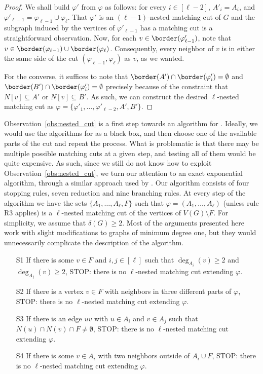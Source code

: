 \begin{proof}
	We shall build $\varphi'$ from $\varphi$ as follows: for every $i \in [\ell - 2]$, $A'_i = A_i$, and $\varphi'_{\ell - 1} = \varphi_{\ell - 1} \cup \varphi_\ell$.
	That $\varphi'$ is an $(\ell - 1)$-nested matching cut of $G$ and the subgraph induced by the vertices of $\varphi'_{\ell - 1}$ has a matching cut is a straightforward observation.
	Now, for each $v \in \border(\varphi'_{\ell - 1})$, note that $v \in \border(\varphi_{\ell - 1}) \cup \border(\varphi_\ell)$.
	Consequently, every neighbor of $v$ is in either the same side of the cut $(\varphi_{\ell - 1}, \varphi_\ell)$ as $v$, as we wanted.
	
	For the converse, it suffices to note that $\border(A') \cap \border(\varphi'_i) = \emptyset$ and $\border(B') \cap \border(\varphi'_i) = \emptyset$ precisely because of the constraint that $N[v] \subseteq A'$ or $N[v] \subseteq B'$.
	As such, we can construct the desired $\ell$-nested matching cut as $\varphi = \{\varphi'_1, \dots, \varphi'_{\ell - 2}, A', B'\}$.
\end{proof}

Observation~\ref{obs:nested_cut} is a first step towards an algorithm for .
Ideally,  we would use the algorithms for  as a black box, and then choose one of the available parts of the cut and repeat the process.
What is problematic is that there may be multiple possible matching cuts at a given step, and testing all of them would be quite expensive.
As such, since we still do not know how to exploit Observation~\ref{obs:nested_cut}, we turn our attention to an exact exponential algorithm, through a similar approach used by \cite{matching_cut_ipec}.
Our algorithm consists of four stopping rules, seven reduction and nine branching rules.
At every step of the algorithm we have the sets $\{A_1, \dots, A_\ell, F\}$ such that $\varphi = (A_1, \dots, A_\ell)$ (unless rule R3 applies) is a $\ell$-nested matching cut of the vertices of $V(G) \setminus F$.
For simplicity, we assume that $\delta(G) \geq 2$.
Most of the arguments presented here work with slight modifications to graphs of minimum degree one, but they would unnecessarily complicate the description of the algorithm.

\begin{itemize}
	\item[S1] If there is some $v \in F$ and $i,j \in [\ell]$ such that $\deg_{A_i}(v) \geq 2$ and $\deg_{A_j}(v) \geq 2$, STOP: there is no $\ell$-nested matching cut extending $\varphi$.
	\item[S2] If there is a vertex $v \in F$ with neighbors in three different parts of $\varphi$, STOP: there is no $\ell$-nested matching cut extending $\varphi$.
	\item[S3] If there is an edge $uv$ with $u \in A_i$ and $v \in A_j$ such that $N(u) \cap N(v) \cap F \neq \emptyset$, STOP: there is no $\ell$-nested matching cut extending $\varphi$.
	\item[S4] If there is some $v \in A_i$ with two neighbors outside of $A_i \cup F$, STOP: there is no $\ell$-nested matching cut extending $\varphi$.
\end{itemize}

